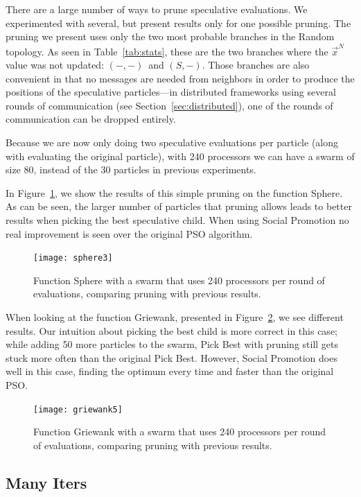 \documentclass[journal,letterpaper]{IEEEtran}
\renewcommand{\sec}[1]{Section~\ref{sec:#1}}
\newcommand{\fig}[1]{Figure~\ref{fig:#1}}
\providecommand{\neigh}{\ensuremath{N}}
\providecommand{\nbest}{\ensuremath{\Vec{x}^\neigh}}
\providecommand{\casexn}{\ensuremath{(S,-)}}
\providecommand{\casepn}{\ensuremath{(-,-)}}
\begin{document}
There are a large number of ways to prune speculative evaluations.  We
experimented with several, but present results only for one possible pruning.
The pruning we present uses only the two most probable branches in the Random
topology.  As seen in Table~\ref{tab:stats}, these are the two branches where
the $\nbest$ value was not updated: \casepn\ and \casexn.  Those branches are
also convenient in that no messages are needed from neighbors in order to
produce the positions of the speculative particles---in distributed frameworks
using several rounds of communication (see \sec{distributed}), one of the
rounds of communication can be dropped entirely.

Because we are now only doing two speculative evaluations per particle (along
with evaluating the original particle), with 240 processors we can have a swarm
of size 80, instead of the 30 particles in previous experiments.  

In \fig{sphere-pruned}, we show the results of this simple pruning on the
function Sphere.  As can be seen, the larger number of particles that pruning
allows leads to better results when picking the best speculative child.  When
using Social Promotion no real improvement is seen over the original PSO
algorithm.

\begin{figure}
  \centering
  \texttt{[image: sphere3]}
  \caption{Function Sphere with a swarm that uses 240 processors per round of
  evaluations, comparing pruning with previous results.}
  \label{fig:sphere-pruned}
\end{figure}

When looking at the function Griewank, presented in \fig{griewank-pruned}, we
see different results.  Our intuition about picking the best child is more
correct in this case; while adding 50 more particles to the swarm, Pick Best
with pruning still gets stuck more often than the original Pick Best.  However,
Social Promotion does well in this case, finding the optimum every time and
faster than the original PSO.

\begin{figure}
  \centering
  \texttt{[image: griewank5]}
  \caption{Function Griewank with a swarm that uses 240 processors per round of
  evaluations, comparing pruning with previous results.}
  \label{fig:griewank-pruned}
\end{figure}


\subsection{Many Iters}
\end{document}
